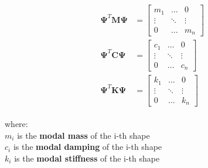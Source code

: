 \documentclass[10pt,b5paper,titlepage]{book}
\newenvironment{eqarray}
{
    \begin{eqnarray}
        \begin{aligned}
}
{
        \end{aligned}
    \end{eqnarray}
}
\begin{document}
\begin{eqarray}
    \mathbf{\Psi}^T \mathbf{M} \mathbf{\Psi}
    &= \begin{bmatrix}
        m_1 & \dots & 0 \\
        \vdots & \ddots & \vdots \\
        0 & \dots & m_n
    \end{bmatrix} \\
    \mathbf{\Psi}^T \mathbf{C} \mathbf{\Psi}
    &= \begin{bmatrix}
        c_1 & \dots & 0 \\
        \vdots & \ddots & \vdots \\
        0 & \dots & c_n
    \end{bmatrix} \\
    \mathbf{\Psi}^T \mathbf{K} \mathbf{\Psi}
    &= \begin{bmatrix}
        k_1 & \dots & 0 \\
        \vdots & \ddots & \vdots \\
        0 & \dots & k_n
    \end{bmatrix}
\end{eqarray}

where: \\
$ m_i $ is the \textbf{modal mass} of the i-th shape\\
$ c_i $ is the \textbf{modal damping} of the i-th shape\\
$ k_i $ is the \textbf{modal stiffness} of the i-th shape
\end{document}
